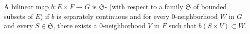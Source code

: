 A bilinear map $b: E \times F \rightarrow G$ is $\mathfrak{S}$- (with respect to a family $\mathfrak{S}$ of bounded subsets of $E$) if $b$ is separately continuous and for every $0$-neighborhood $W$ in $G$ and every $S \in \mathfrak{S}$, there exists a $0$-neighborhood $V$ in $F$ such that $b(S \times V) \subset W$.
